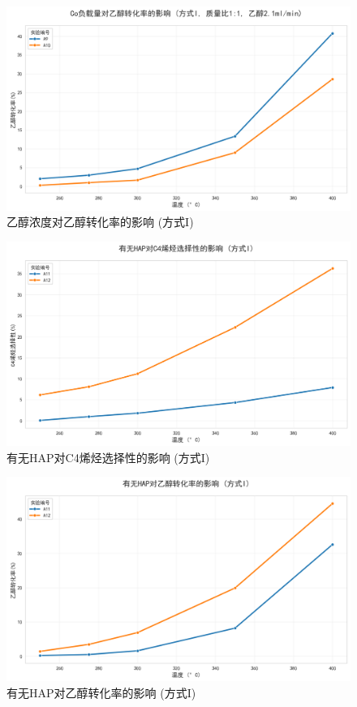 \begin{figure}[h]%
	\centering%
	\includegraphics [scale=0.6]{图/2-3-2-2.png}
	\caption{乙醇浓度对乙醇转化率的影响 (方式I)} 
	\label{fig:1}
\end{figure}

\begin{figure}[h]%
	\centering%
	\includegraphics [scale=0.6]{图/2-4-1-1.png}
	\caption{有无HAP对C4烯烃选择性的影响 (方式I)} 
	\label{fig:1}
\end{figure}

\begin{figure}[h]%
	\centering%
	\includegraphics [scale=0.6]{图/2-4-1-2.png}
	\caption{有无HAP对乙醇转化率的影响 (方式I)} 
	\label{fig:1}
\end{figure}


